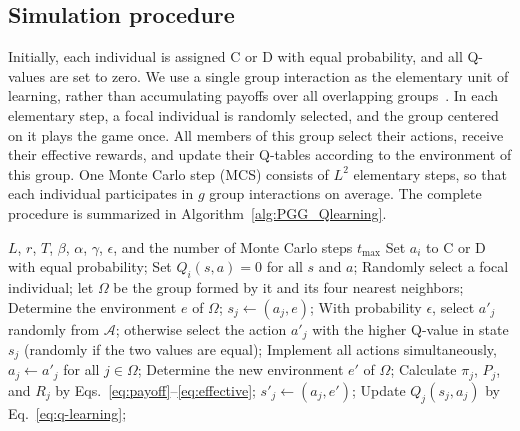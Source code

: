 \documentclass[%
  aip,cha,
  amsmath,amssymb,
  reprint,
  floatfix,
  article-title,
]{revtex4-2}
\begin{document}
\subsection{Simulation procedure}\label{sec:simulation}

Initially, each individual is assigned $\mathrm{C}$ or $\mathrm{D}$ with equal probability, and all Q-values are set to zero. We use a single group interaction as the elementary unit of learning, rather than accumulating payoffs over all overlapping groups~\cite{li2025environmental}. In each elementary step, a focal individual is randomly selected, and the group centered on it plays the game once. All members of this group select their actions, receive their effective rewards, and update their Q-tables according to the environment of this group. One Monte Carlo step (MCS) consists of $L^2$ elementary steps, so that each individual participates in $g$ group interactions on average. The complete procedure is summarized in Algorithm~\ref{alg:PGG_Qlearning}.

\begin{algorithm}[H]
\caption{Spatial public goods game with peer pressure and Q-learning.}
\label{alg:PGG_Qlearning}
\begin{algorithmic}[1]
\REQUIRE $L$, $r$, $T$, $\beta$, $\alpha$, $\gamma$, $\epsilon$, and the number of Monte Carlo steps $t_{\max}$
    \STATE Set $a_i$ to $\mathrm{C}$ or $\mathrm{D}$ with equal probability;
    \STATE Set $Q_i(s,a)=0$ for all $s$ and $a$;
\ENDFOR
{}
        \STATE Randomly select a focal individual; let $\Omega$ be the group formed by it and its four nearest neighbors;
        \STATE Determine the environment $e$ of $\Omega$;
            \STATE $s_j\leftarrow(a_j,e)$;
            \STATE With probability $\epsilon$, select $a'_j$ randomly from $\mathcal{A}$; otherwise select the action $a'_j$ with the higher Q-value in state $s_j$ (randomly if the two values are equal);
        \ENDFOR
        \STATE Implement all actions simultaneously, $a_j\leftarrow a'_j$ for all $j\in\Omega$;
        \STATE Determine the new environment $e'$ of $\Omega$;
            \STATE Calculate $\pi_j$, $P_j$, and $R_j$ by Eqs.~\eqref{eq:payoff}--\eqref{eq:effective};
            \STATE $s'_j\leftarrow(a_j,e')$;
            \STATE Update $Q_j(s_j,a_j)$ by Eq.~\eqref{eq:q-learning};
        \ENDFOR
    \ENDFOR
\ENDFOR
\end{algorithmic}
\end{algorithm}
\end{document}
